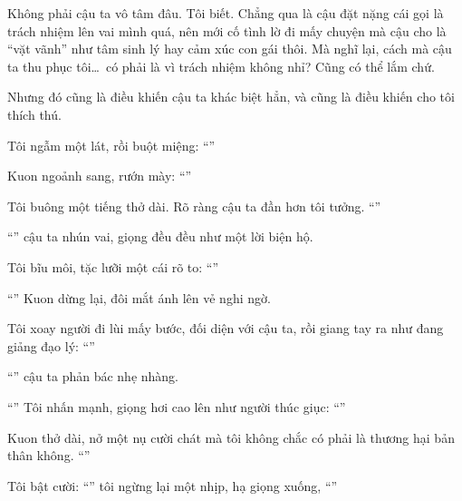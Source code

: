 \documentclass[../main.tex]{subfiles}
\begin{document}
Không phải cậu ta vô tâm đâu. Tôi biết. Chẳng qua là cậu đặt nặng cái gọi là trách nhiệm lên vai mình quá, nên mới cố tình lờ đi mấy chuyện mà cậu cho là ``vặt vãnh'' như tâm sinh lý hay cảm xúc con gái thôi. Mà nghĩ lại, cách mà cậu ta thu phục tôi\dots\ có phải là vì trách nhiệm không nhỉ? Cũng có thể lắm chứ.

Nhưng đó cũng là điều khiến cậu ta khác biệt hẳn, và cũng là điều khiến cho tôi thích thú.

Tôi ngẫm một lát, rồi buột miệng: ``''

Kuon ngoảnh sang, rướn mày: ``''

Tôi buông một tiếng thở dài. Rõ ràng cậu ta đần hơn tôi tưởng. ``''

``'' cậu ta nhún vai, giọng đều đều như một lời biện hộ.

Tôi bĩu môi, tặc lưỡi một cái rõ to: ``''

``'' Kuon dừng lại, đôi mắt ánh lên vẻ nghi ngờ.

Tôi xoay người đi lùi mấy bước, đối diện với cậu ta, rồi giang tay ra như đang giảng đạo lý: ``''

``'' cậu ta phản bác nhẹ nhàng.

``'' Tôi nhấn mạnh, giọng hơi cao lên như người thúc giục: ``''

Kuon thở dài, nở một nụ cười chát mà tôi không chắc có phải là thương hại bản thân không. ``''

Tôi bật cười: ``'' tôi ngừng lại một nhịp, hạ giọng xuống, ``''
\end{document}
